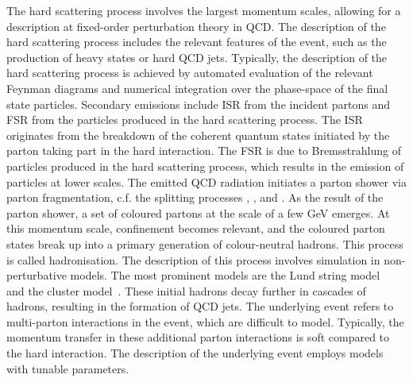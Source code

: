 The hard scattering process involves the largest momentum scales, allowing for a description at fixed-order perturbation theory in QCD. The description of the hard scattering process includes the relevant features of the event, such as the production of heavy states or hard QCD jets. Typically, the description of the hard scattering process is achieved by automated evaluation of the relevant Feynman diagrams and numerical integration over the phase-space of the final state particles.
Secondary emissions include ISR from the incident partons and FSR from the particles produced in the hard scattering process. The ISR originates from the breakdown of the coherent quantum states initiated by the parton taking part in the hard interaction. The FSR is due to Bremsstrahlung of particles produced in the hard scattering process, which results in the emission of particles at lower scales. The emitted QCD radiation initiates a parton shower via parton fragmentation, c.f. the splitting processes \HepProcess{\Pq \to \Pq \Pgluon}, \HepProcess{\Pgluon \to \Pgluon \Pgluon}, and \HepProcess{\Pgluon \to \Pq \Paq}. As the result of the parton shower, a set of coloured partons at the scale of a few \si{\giga\electronvolt} emerges. At this momentum scale, confinement becomes relevant, and the coloured parton states break up into a primary generation of colour-neutral hadrons. This process is called hadronisation. The description of this process involves simulation in non-perturbative models. The most prominent models are the Lund string model~\cite{Andersson1983} and the cluster model~\cite{Webber1984,Marchesini1988,Marchesini1992}. These initial hadrons decay further in cascades of hadrons, resulting in the formation of QCD jets.
The underlying event refers to multi-parton interactions in the event, which are difficult to model. Typically, the momentum transfer in these additional parton interactions is soft compared to the hard interaction. The description of the underlying event employs models with tunable parameters.

